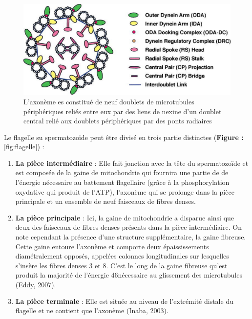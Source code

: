 \documentclass[12pt,twoside]{reedthesis}
\providecommand{\tightlist}{%
  \setlength{\itemsep}{0pt}\setlength{\parskip}{0pt}}
\theoremstyle{definition}
\theoremstyle{definition}
\theoremstyle{remark}
\begin{document}
  \begin{figure}
  
  {\centering \includegraphics[scale=.3]{figure/axoneme} 
  
  }
  
  \caption[Structure simplifiée de l'axonème d'après Inaba (2003)]{L'axonème es constitué de neuf doublets de microtubules périphériques reliés entre eux par des liens de nexine d'un doublet central relié aux doublets périphériques par des ponts radiaires}\label{fig:axoneme}
  \end{figure}
  
  Le flagelle su spermatozoïde peut être divisé en trois partie distinctes
  (\textbf{Figure : }\ref{fig:flagelle}) :
  
  \begin{enumerate}
  \def\labelenumi{\arabic{enumi}.}
  \tightlist
  \item
    \textbf{La pièce intermédiaire} : Elle fait jonction avec la tête du
    spermatozoïde et est composée de la gaine de mitochondrie qui fournira
    une partie de de l'énergie nécessaire au battement flagellaire (grâce
    à la phosphorylation oxydative qui produit de l'ATP), l'axonème qui se
    prolonge dans la pièce principale et un ensemble de neuf faisceaux de
    fibres denses.\\
  \item
    \textbf{La pièce principale} : Ici, la gaine de mitochondrie a
    disparue ainsi que deux des faisceaux de fibres denses présents dans
    la pièce intermédiaire. On note cependant la présence d'une structure
    supplémentaire, la gaine fibreuse. Cette gaine entoure l'axonème et
    comporte deux épaississements diamétralement opposés, appelées
    colonnes longitudinales sur lesquelles s'insère les fibres denses 3 et
    8. C'est le long de la gaine fibreuse qu'est produit la majorité de
    l'énergie 46nécessaire au glissement des microtubules (Eddy, 2007).\\
  \item
    \textbf{La pièce terminale} : Elle est située au niveau de l'extrémité
    distale du flagelle et ne contient que l'axonème (Inaba, 2003).
  \end{enumerate}
  
\end{document}
